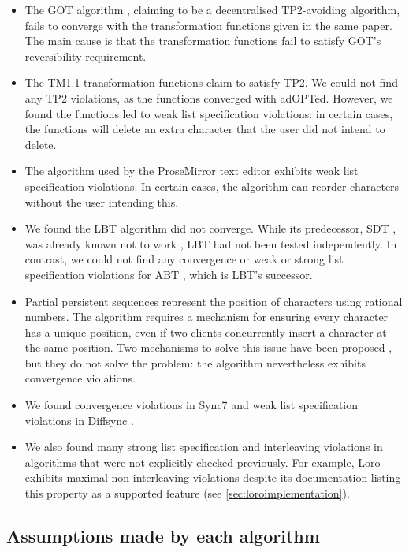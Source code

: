 \documentclass[sigplan,10pt,review,anonymous]{acmart}
\begin{document}
\begin{itemize}
  \item
    The GOT algorithm \cite{Sun1998TOCHI}, claiming to be a decentralised TP2-avoiding algorithm, fails to converge with the transformation functions given in the same paper. The main cause is that the transformation functions fail to satisfy GOT's reversibility requirement.
  \item
    The TM1.1 transformation functions \cite{Sun2017} claim to satisfy TP2. We could not find any TP2 violations, as the functions converged with adOPTed. However, we found the functions led to weak list specification violations: in certain cases, the functions will delete an extra character that the user did not intend to delete.
  \item
    The algorithm used by the ProseMirror text editor \cite{Haverbeke2015} exhibits weak list specification violations. In certain cases, the algorithm can reorder characters without the user intending this.
  \item
    We found the LBT \cite{Li2005} algorithm did not converge. While its predecessor, SDT \cite{Li2008}, was already known not to work \cite{Oster2005Proving}, LBT had not been tested independently. In contrast, we could not find any convergence or weak or strong list specification violations for ABT \cite{Li2010}, which is LBT's successor.
  \item
    Partial persistent sequences \cite{Wu2010} represent the position of characters using rational numbers. The algorithm requires a mechanism for ensuring every character has a unique position, even if two clients concurrently insert a character at the same position. Two mechanisms to solve this issue have been proposed \cite{Wu2009, Wu2010}, but they do not solve the problem: the algorithm nevertheless exhibits convergence violations.
  \item
    We found convergence violations in Sync7 \cite{Little2024} and weak list specification violations in Diffsync \cite{Little2017}.
  \item
    We also found many strong list specification and interleaving violations in algorithms that were not explicitly checked previously. For example, Loro exhibits maximal non-interleaving violations despite its documentation listing this property as a supported feature (see \autoref{sec:loroimplementation}).
\end{itemize}



\subsection{Assumptions made by each algorithm}  \label{sec:assumptions}
\end{document}
